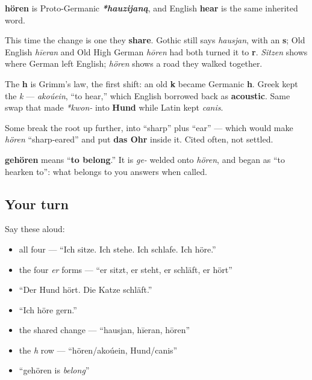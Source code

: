 \begin{cousinweb}
\textbf{hören} is Proto-Germanic \emph{\textbf{*hauzijaną}}, and English \textbf{hear} is the same inherited word.

This time the change is one they \textbf{share}. Gothic still says \emph{hausjan}, with an \textbf{s}; Old English \emph{hīeran} and Old High German \emph{hōren} had both turned it to \textbf{r}. \emph{Sitzen} shows where German left English; \emph{hören} shows a road they walked together.

The \textbf{h} is Grimm's law, the first shift: an old \textbf{k} became Germanic \textbf{h}. Greek kept the \emph{k} — \emph{akoúein}, \textquotedblleft{}to hear,\textquotedblright{} which English borrowed back as \textbf{acoustic}. Same swap that made \emph{*kwon-} into \textbf{Hund} while Latin kept \emph{canis}.

Some break the root up further, into \textquotedblleft{}sharp\textquotedblright{} plus \textquotedblleft{}ear\textquotedblright{} — which would make \emph{hören} \textquotedblleft{}sharp-eared\textquotedblright{} and put \textbf{das Ohr} inside it. Cited often, not settled.
\end{cousinweb}

\begin{culture}
\textbf{gehören} means \textquotedblleft{}\textbf{to belong}.\textquotedblright{} It is \emph{ge-} welded onto \emph{hören}, and began as \textquotedblleft{}to hearken to\textquotedblright{}: what belongs to you answers when called.
\end{culture}

\subsection*{Your turn}
Say these aloud:

\begin{itemize}
\raggedright
  \item all four — \textquotedblleft{}Ich sitze. Ich stehe. Ich schlafe. Ich höre.\textquotedblright{}
  \item the four \emph{er} forms — \textquotedblleft{}er sitzt, er steht, er schläft, er hört\textquotedblright{}
  \item \textquotedblleft{}Der Hund hört. Die Katze schläft.\textquotedblright{}
  \item \textquotedblleft{}Ich höre gern.\textquotedblright{}
  \item the shared change — \textquotedblleft{}hausjan, hīeran, hōren\textquotedblright{}
  \item the \emph{h} row — \textquotedblleft{}hören/akoúein, Hund/canis\textquotedblright{}
  \item \textquotedblleft{}gehören is \emph{belong}\textquotedblright{}
\end{itemize}

